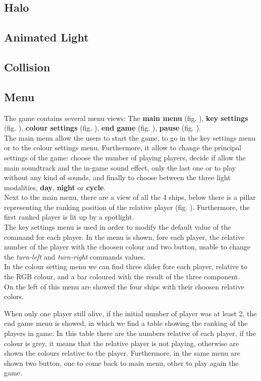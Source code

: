 \documentclass[11pt]{article}
\begin{document}
\subsection{Halo}
\subsection{Animated Light}
\subsection{Collision}
\subsection{Menu}
	The game contains several menu views: The \textbf{main menu} (fig. ), \textbf{key settings} (fig. ), \textbf{colour settings} (fig. ), \textbf{end game} (fig. ), \textbf{pause} (fig. ).\\
	
	The main menu allow the users to start the game, to go in the key settings menu or to the colour settings menu.
	Furthermore, it allow to change the principal settings of the game: choose the number of playing players, decide if allow the main soundtrack and the in-game sound effect, only the last one or to play without any kind of sounds, and finally to choose between the three light modalities, \textbf{day}, \textbf{night} or \textbf{cycle}.\\
	Next to the main menu, there are a view of all the 4 ships, below there is a pillar representing the ranking position of the relative player (fig. ).
	Furthermore, the first ranked player is lit up by a spotlight.\\
	
	The key settings menu is used in order to modify the default value of the command for each player. In the menu is shown, fore each player, the relative number of the player with the choosen colour and two button, usable to change the \textit{turn-left} and \textit{turn-right} commands values.\\
	
	In the colour setting menu we can find three slider fore each player, relative to the RGB colour, and a bar coloured with the result of the three component.\\
	On the left of this menu are showed the four ships with their choosen relative colors.
	
	When only one player still alive, if the initial number of player was at least 2, the end game menu is showed, in which we find a table showing the ranking of the players in game. In this table there are the numbers relative of each player, if the colour is grey, it means that the relative player is not playing, otherwise are shown the colours relative to the player.
	Furthermore, in the same menu are shown two button, one to come back to main menu, other to play again the game.\\
	
\end{document}
